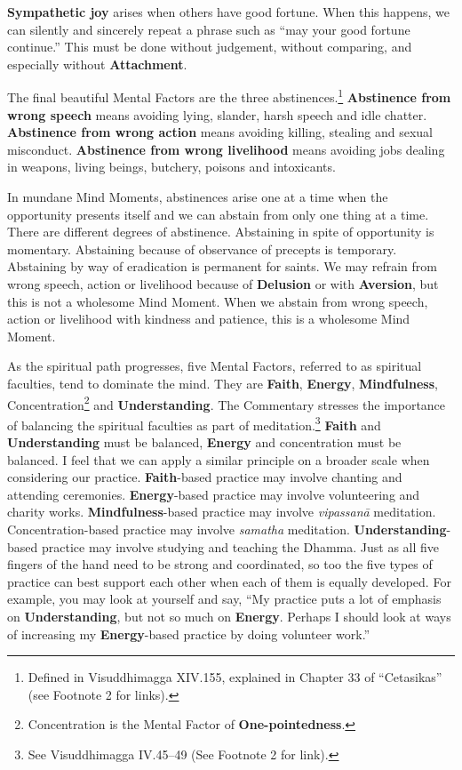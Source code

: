 
\textbf{Sympathetic joy} arises when others have good fortune. When this happens, we can silently and sincerely repeat a phrase such as “may your good fortune continue.” This must be done without judgement, without comparing, and especially without \textbf{Attachment}.

The final beautiful Mental Factors are the three abstinences.\footnote{Defined in Visuddhimagga XIV.155, explained in Chapter 33 of “Cetasikas” (see Footnote 2 for links).} \textbf{Abstinence from wrong speech} means avoiding lying, slander, harsh speech and idle chatter. \textbf{Abstinence from wrong action} means avoiding killing, stealing and sexual misconduct. \textbf{Abstinence from wrong livelihood} means avoiding jobs dealing in weapons, living beings, butchery, poisons and intoxicants. 

In mundane Mind Moments, abstinences arise one at a time when the opportunity presents itself and we can abstain from only one thing at a time. There are different degrees of abstinence. Abstaining in spite of opportunity is momentary. Abstaining because of observance of precepts is temporary. Abstaining by way of eradication is permanent for saints. We may refrain from wrong speech, action or livelihood because of \textbf{Delusion} or with \textbf{Aversion}, but this is not a wholesome Mind Moment. When we abstain from wrong speech, action or livelihood with kindness and patience, this is a wholesome Mind Moment.

As the spiritual path progresses, five Mental Factors, referred to as spiritual faculties, tend to dominate the mind. They are \textbf{Faith}, \textbf{Energy}, \textbf{Mindfulness}, Concentration\footnote{Concentration is the Mental Factor of \textbf{One-pointedness}.} and \textbf{Understanding}. The Commentary stresses the importance of balancing the spiritual faculties as part of meditation.\footnote{See Visuddhimagga IV.45--49 (See Footnote 2 for link).} \textbf{Faith} and \textbf{Understanding} must be balanced, \textbf{Energy} and concentration must be balanced. I feel that we can apply a similar principle on a broader scale when considering our practice. \textbf{Faith}-based practice may involve chanting and attending ceremonies. \textbf{Energy}-based practice may involve volunteering and charity works. \textbf{Mindfulness}-based practice may involve \textit{vipassanā} meditation. Concentration-based practice may involve \textit{samatha} meditation. \textbf{Understanding}-based practice may involve studying and teaching the Dhamma. Just as all five fingers of the hand need to be strong and coordinated, so too the five types of practice can best support each other when each of them is equally developed. For example, you may look at yourself and say, “My practice puts a lot of emphasis on \textbf{Understanding}, but not so much on \textbf{Energy}. Perhaps I should look at ways of increasing my \textbf{Energy}-based practice by doing volunteer work.”

